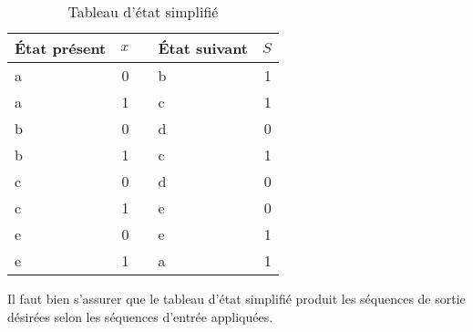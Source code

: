 \documentclass[letter, oneside]{book}
\begin{document}
\begin{table}[htbp]
\caption{\label{tab:orga1eb362}Tableau d'état simplifié}
\centering
\begin{tabular}{lrllr}
État présent & \(x\) &  & État suivant & \(S\)\\[0pt]
\hline
a & 0 &  & b & 1\\[0pt]
a & 1 &  & c & 1\\[0pt]
b & 0 &  & d & 0\\[0pt]
b & 1 &  & c & 1\\[0pt]
c & 0 &  & d & 0\\[0pt]
c & 1 &  & e & 0\\[0pt]
e & 0 &  & e & 1\\[0pt]
e & 1 &  & a & 1\\[0pt]
\end{tabular}
\end{table}

Il faut bien s'assurer que le tableau d'état simplifié produit les
séquences de sortie désirées selon les séquences d'entrée appliquées.
\end{document}
